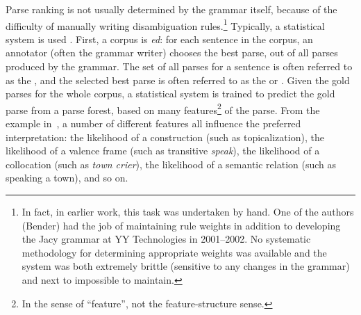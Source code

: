 \documentclass[output=paper,nonflat]{langsci/langscibook}
\begin{document}
Parse ranking is not usually determined by the grammar itself, because
of the difficulty of manually writing disambiguation
rules.\footnote{In fact, in earlier work, this task was undertaken by
  hand. One of the authors (Bender) had the job of maintaining rule
  weights in addition to developing the Jacy grammar \citep*{SBB2016a}
  at YY Technologies in 2001--2002. No systematic methodology for
  determining appropriate weights was available and the system was
  both extremely brittle (sensitive to any changes in the grammar) and
  next to impossible to maintain.}
Typically, a statistical system is used \citep{Tou:Man:Shi:Fli:Oep:02,Tou:Man:Fli:Oep:05}.
First, a corpus is \textit{ed}:
for each sentence in the corpus,
an annotator (often the grammar writer) chooses the best parse,
out of all parses produced by the grammar.
The set of all parses for a sentence is often referred to as the \textit{},
and the selected best parse is often referred to as the \textit{} or \textit{}.
Given the gold parses for the whole corpus, a statistical system is trained
to predict the gold parse from a parse forest,
based on many features\footnote{%
	In the  sense of ``feature'',
	not the feature-structure sense.
}
of the parse.
From the example in~,
a number of different features all influence the preferred interpretation:
the likelihood of a construction (such as topicalization),
the likelihood of a valence frame (such as transitive \textit{speak}),
the likelihood of a collocation (such as \textit{town crier}),
the likelihood of a semantic relation (such as speaking a town),
and so on.
\end{document}
